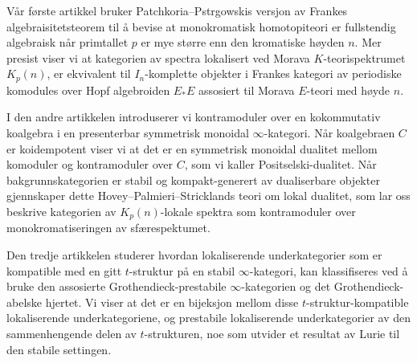 Vår første artikkel bruker Patchkoria--Pstr\a{}gowskis versjon av Frankes algebraisitetsteorem til å bevise at monokromatisk homotopiteori er fullstendig algebraisk når primtallet $p$ er mye større enn den kromatiske høyden $n$. Mer presist viser vi at kategorien av spectra lokalisert ved Morava $K$-teorispektrumet $K_p(n)$, er ekvivalent til $I_n$-komplette objekter i Frankes kategori av periodiske komodules over Hopf algebroiden $E_*E$ assosiert til Morava $E$-teori med høyde $n$. 

I den andre artikkelen introduserer vi kontramoduler over en kokommutativ koalgebra i en presenterbar symmetrisk monoidal $\infty$-kategori. Når koalgebraen $C$ er koidempotent viser vi at det er en symmetrisk monoidal dualitet mellom komoduler og kontramoduler over $C$, som vi kaller Positselski-dualitet. Når bakgrunnskategorien er stabil og kompakt-generert av dualiserbare objekter gjennskaper dette Hovey--Palmieri--Stricklands teori om lokal dualitet, som lar oss beskrive kategorien av $K_p(n)$-lokale spektra som kontramoduler over monokromatiseringen av sfærespektumet. 

Den tredje artikkelen studerer hvordan lokaliserende underkategorier som er kompatible med en gitt $t$-struktur på en stabil $\infty$-kategori, kan klassifiseres ved å bruke den assosierte Grothendieck-prestabile $\infty$-kategorien og det Grothendieck-abelske hjertet. Vi viser at det er en bijeksjon mellom disse $t$-struktur-kompatible lokaliserende underkategoriene, og prestabile lokaliserende underkategorier av den sammenhengende delen av $t$-strukturen, noe som utvider et resultat av Lurie til den stabile settingen. 



